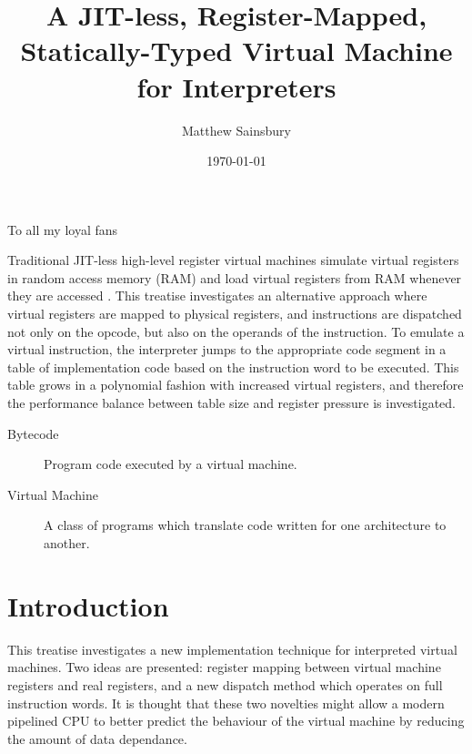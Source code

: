 



\title{A JIT-less, Register-Mapped, Statically-Typed Virtual Machine for Interpreters}
\author{Matthew Sainsbury}
\date{\today}

\begin{titlepage}

		\maketitle
	
\end{titlepage}


	To all my loyal fans

	Traditional JIT-less high-level register virtual machines simulate virtual registers in random access memory (RAM) and load virtual registers from RAM whenever they are accessed \citep{caseregistervm}. This treatise investigates an alternative approach where virtual registers are mapped to physical registers, and instructions are dispatched not only on the opcode, but also on the operands of the instruction. To emulate a virtual instruction, the interpreter jumps to the appropriate code segment in a table of implementation code based on the instruction word to be executed. This table grows in a polynomial fashion with increased virtual registers, and therefore the performance balance between table size and register pressure is investigated.



\tableofcontents

\begin{description}
	\item[Bytecode] Program code executed by a virtual machine.
	\item[Virtual Machine] A class of programs which translate code written for one architecture to another.
\end{description}


\chapter{Introduction}
	\startrealnumbers
	This treatise investigates a new implementation technique for interpreted virtual machines. Two ideas are presented: register mapping between virtual machine registers and real registers, and a new dispatch method which operates on full instruction words. It is thought  that these two novelties might allow a modern pipelined CPU to better predict the behaviour of the virtual machine by reducing the amount of data dependance.
	
